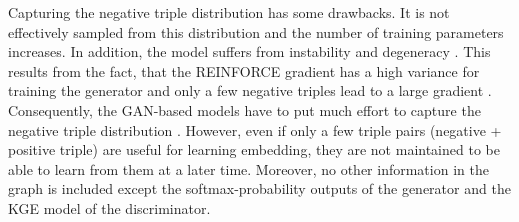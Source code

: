 Capturing the negative triple distribution has some drawbacks.
It is not effectively sampled from this distribution and the number of training parameters increases.
In addition, the model suffers from instability and degeneracy \cite{zhang2021efficient}.
This results from the fact, that the \textsc{REINFORCE} gradient has a high variance for training the generator and only a few negative triples lead to a large gradient \cite{zhang2021efficient}.
Consequently, the \ac{GAN}-based models have to put much effort to capture the negative triple distribution \cite{zhang2021efficient}.
However, even if only a few triple pairs (negative + positive triple) are useful for learning embedding, they are not maintained to be able to learn from them at a later time.
Moreover, no other information in the graph is included except the softmax-probability outputs of the generator and the \ac{KGE} model of the discriminator.